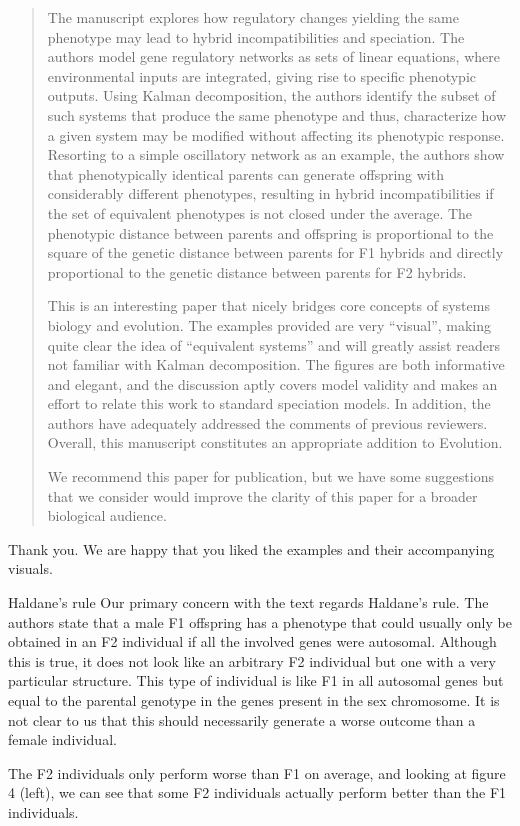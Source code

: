 \begin{quote}
The manuscript explores how regulatory changes yielding the same phenotype may lead to hybrid incompatibilities and speciation. The authors model gene regulatory networks as sets of linear equations, where environmental inputs are integrated, giving rise to specific phenotypic outputs. Using Kalman decomposition, the authors identify the subset of such systems that produce the same phenotype and thus, characterize how a given system may be modified without affecting its phenotypic response. Resorting to a simple oscillatory network as an example, the authors show that phenotypically identical parents can generate offspring with considerably different phenotypes, resulting in hybrid incompatibilities if the set of equivalent phenotypes is not closed under the average. The phenotypic distance between parents and offspring is proportional to the square of the genetic distance between parents for F1 hybrids and directly proportional to the genetic distance between parents for F2 hybrids.

This is an interesting paper that nicely bridges core concepts of systems biology and evolution. The examples provided are very ``visual'', making quite clear the idea of ``equivalent systems'' and will greatly assist readers not familiar with Kalman decomposition. The figures are both informative and elegant, and the discussion aptly covers model validity and makes an effort to relate this work to standard speciation models. In addition, the authors have adequately addressed the comments of previous reviewers. Overall, this manuscript constitutes an appropriate addition to Evolution.

We recommend this paper for publication, but we have some suggestions that we consider would improve the clarity of this paper for a broader biological audience.
\end{quote}

Thank you. We are happy that you liked the examples and their accompanying visuals. 

\begin{point}{Haldane's rule}
Our primary concern with the text regards Haldane's rule. The authors state that a male F1 offspring has a phenotype that could usually only be obtained in an F2 individual if all the involved genes were autosomal. Although this is true, it does not look like an arbitrary F2 individual but one with a very particular structure. This type of individual is like F1 in all autosomal genes but equal to the parental genotype in the genes present in the sex chromosome. It is not clear to us that this should necessarily generate a worse outcome than a female individual.

The F2 individuals only perform worse than F1 on average, and looking at figure 4 (left), we can see that some F2 individuals actually perform better than the F1 individuals.
\end{point}

